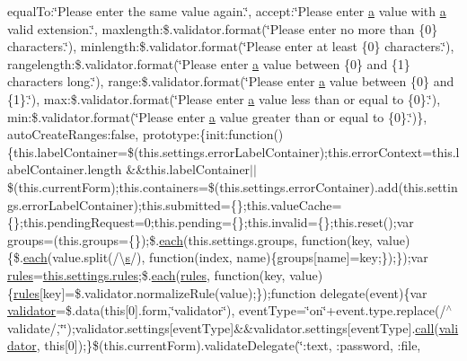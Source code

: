 \begin{DoxyCompactItemize}
equal\+To\+:\char`\"{}Please enter the same value again.\char`\"{}, accept\+:\char`\"{}Please enter \hyperlink{_scripts_2bootstrap_8min_8js_a7318f59fb86a4437995ee89c780c51ac}{a} value with \hyperlink{_scripts_2bootstrap_8min_8js_a7318f59fb86a4437995ee89c780c51ac}{a} valid extension.\char`\"{}, maxlength\+:\$.\+validator.\+format(\char`\"{}Please enter no more than \{0\} characters.\char`\"{}), minlength\+:\$.\+validator.\+format(\char`\"{}Please enter at least \{0\} characters.\char`\"{}), rangelength\+:\$.\+validator.\+format(\char`\"{}Please enter \hyperlink{_scripts_2bootstrap_8min_8js_a7318f59fb86a4437995ee89c780c51ac}{a} value between \{0\} and \{1\} characters long.\char`\"{}), range\+:\$.\+validator.\+format(\char`\"{}Please enter \hyperlink{_scripts_2bootstrap_8min_8js_a7318f59fb86a4437995ee89c780c51ac}{a} value between \{0\} and \{1\}.\char`\"{}), max\+:\$.\+validator.\+format(\char`\"{}Please enter \hyperlink{_scripts_2bootstrap_8min_8js_a7318f59fb86a4437995ee89c780c51ac}{a} value less than or equal to \{0\}.\char`\"{}), min\+:\$.\+validator.\+format(\char`\"{}Please enter \hyperlink{_scripts_2bootstrap_8min_8js_a7318f59fb86a4437995ee89c780c51ac}{a} value greater than or equal to \{0\}.\char`\"{})\}, auto\+Create\+Ranges\+:false, prototype\+:\{init\+:function()\{this.\+label\+Container=\$(this.\+settings.\+error\+Label\+Container);this.\+error\+Context=this.\+label\+Container.\+length \&\&this.\+label\+Container$\vert$$\vert$\$(this.\+current\+Form);this.\+containers=\$(this.\+settings.\+error\+Container).add(this.\+settings.\+error\+Label\+Container);this.\+submitted=\{\};this.\+value\+Cache=\{\};this.\+pending\+Request=0;this.\+pending=\{\};this.\+invalid=\{\};this.\+reset();var groups=(this.\+groups=\{\});\$.\hyperlink{_scripts_2jquery-1_810_82_8min_8js_af24c9ea1e34372f8c8b312b35586008d}{each}(this.\+settings.\+groups, function(key, value)\{\$.\hyperlink{_scripts_2jquery-1_810_82_8min_8js_af24c9ea1e34372f8c8b312b35586008d}{each}(value.\+split(/\textbackslash{}\hyperlink{_scripts_2respond_8min_8js_ad9a7d92cb87932d25187fdec3ba1b621}{s}/), function(index, name)\{groups\mbox{[}name\mbox{]}=key;\});\});var \hyperlink{_scripts_2respond_8js_ada87c2e257bc5ff6e77cdbc23ed986a3}{rules}=\hyperlink{_scripts_2respond_8js_ada87c2e257bc5ff6e77cdbc23ed986a3}{this.\+settings.\+rules};\$.\hyperlink{_scripts_2jquery-1_810_82_8min_8js_af24c9ea1e34372f8c8b312b35586008d}{each}(\hyperlink{_scripts_2respond_8js_ada87c2e257bc5ff6e77cdbc23ed986a3}{rules}, function(key, value)\{\hyperlink{_scripts_2respond_8js_ada87c2e257bc5ff6e77cdbc23ed986a3}{rules}\mbox{[}key\mbox{]}=\$.validator.\+normalize\+Rule(value);\});function delegate(event)\{var \hyperlink{_scripts_2jquery_8validate_8js_a2dc8272bb221cdffcccbd20db038f172}{validator}=\$.data(this\mbox{[}0\mbox{]}.form,\char`\"{}validator\char`\"{}), event\+Type=\char`\"{}on\char`\"{}+event.\+type.\+replace(/$^\wedge$validate/,\char`\"{}\char`\"{});validator.\+settings\mbox{[}event\+Type\mbox{]}\&\&validator.\+settings\mbox{[}event\+Type\mbox{]}.\hyperlink{_scripts_2dropzone_8js_aafc46d047b4d7639fd2c4b927ec5048c}{call}(\hyperlink{_scripts_2jquery_8validate_8js_a2dc8272bb221cdffcccbd20db038f172}{validator}, this\mbox{[}0\mbox{]});\}\$(this.\+current\+Form).validate\+Delegate(\char`\"{}\+:text, \+:password, \+:file, 
\end{DoxyCompactItemize}
